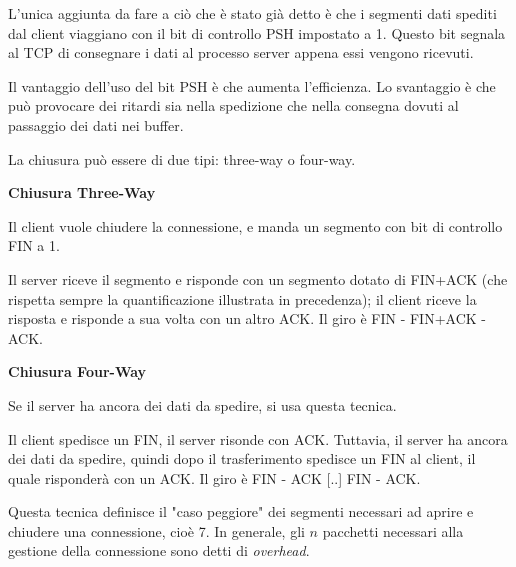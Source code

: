             L'unica aggiunta da fare a ciò che è stato già detto è che i segmenti dati spediti dal client viaggiano con il bit di controllo PSH impostato a 1. Questo bit segnala al TCP di consegnare i dati al processo server appena essi vengono ricevuti.
            
            Il vantaggio dell'uso del bit PSH è che aumenta l'efficienza. Lo svantaggio è che può provocare dei ritardi sia nella spedizione che nella consegna dovuti al passaggio dei dati nei buffer.
            
        
            La chiusura può essere di due tipi: three-way o four-way.
            
            \vspace{3mm}
            
            \textbf{Chiusura Three-Way}
            
                \vspace{3mm}
            
                Il client vuole chiudere la connessione, e manda un segmento con bit di controllo FIN a 1.
                
                Il server riceve il segmento e risponde con un segmento dotato di FIN+ACK (che rispetta sempre la quantificazione illustrata in precedenza); il client riceve la risposta e risponde a sua volta con un altro ACK. Il giro è FIN - FIN+ACK - ACK.
                
                \vspace{3mm}
                
            \textbf{Chiusura Four-Way}
            
                \vspace{3mm}
            
                Se il server ha ancora dei dati da spedire, si usa questa tecnica.
                
                Il client spedisce un FIN, il server risonde con ACK. Tuttavia, il server ha ancora dei dati da spedire, quindi dopo il trasferimento spedisce un FIN al client, il quale risponderà con un ACK. Il giro è FIN - ACK [..] FIN - ACK.
                
                Questa tecnica definisce il "caso peggiore" dei segmenti necessari ad aprire e chiudere una connessione, cioè 7. In generale, gli $n$ pacchetti necessari alla gestione della connessione sono detti di \textit{overhead}.
                
